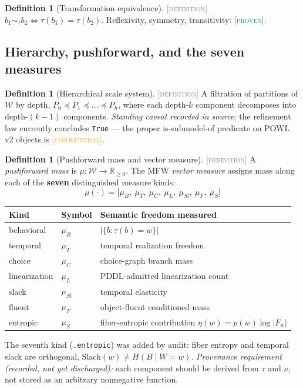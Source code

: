 \documentclass[11pt]{article}
\newcommand{\PROVEN}{\textcolor{teal}{\textsc{[proven]}}}
\newcommand{\DEFINITION}{\textcolor{gray}{\textsc{[definition]}}}
\newcommand{\CONJECTURAL}{\textcolor{orange}{\textsc{[conjectural]}}}
\newcommand{\WS}{\mathcal{W}}                  %
\newcommand{\tmap}{\tau}                       %
\newcommand{\fib}[1]{F_{#1}}                   %
\newcommand{\R}{\mathbb{R}}
\theoremstyle{plain}
\theoremstyle{definition}
\newtheorem{definition}[theorem]{Definition}
\begin{document}
\begin{definition}[Transformation equivalence]\DEFINITION\;
$b_1 \sim_\tmap b_2 \iff \tmap(b_1) = \tmap(b_2)$. Reflexivity, symmetry,
transitivity: \PROVEN.
\end{definition}

\subsection{Hierarchy, pushforward, and the seven measures}

\begin{definition}[Hierarchical scale system]\DEFINITION\;
A filtration of partitions of $\WS$ by depth,
$P_0 \preceq P_1 \preceq \dots \preceq P_h$, where each depth-$k$ component
decomposes into depth-$(k{-}1)$ components. \emph{Standing caveat recorded in
source:} the refinement law currently concludes \texttt{True} --- the proper
is-submodel-of predicate on POWL v2 objects is \CONJECTURAL.
\end{definition}

\begin{definition}[Pushforward mass and vector measure]\DEFINITION\;
A \emph{pushforward mass} is $\mu : \WS \to \R_{\ge 0}$. The MFW
\emph{vector measure} assigns mass along each of the \textbf{seven}
distinguished measure kinds:
\[
  \mu(\cdot) = \big[\mu_B,\ \mu_T,\ \mu_C,\ \mu_L,\ \mu_{Sl},\ \mu_F,\ \mu_S\big]
\]
\begin{center}
\begin{tabular}{@{}lll@{}}
\toprule
Kind & Symbol & Semantic freedom measured \\
\midrule
behavioral    & $\mu_B$    & $|\{b : \tmap(b) = w\}|$ \\
temporal      & $\mu_T$    & temporal realization freedom \\
choice        & $\mu_C$    & choice-graph branch mass \\
linearization & $\mu_L$    & PDDL-admitted linearization count \\
slack         & $\mu_{Sl}$ & temporal elasticity \\
fluent        & $\mu_F$    & object-fluent conditioned mass \\
entropic      & $\mu_S$    & fiber-entropic contribution $\eta(w) = p(w)\log|\fib{w}|$ \\
\bottomrule
\end{tabular}
\end{center}
The seventh kind (\texttt{.entropic}) was added by audit: fiber entropy and
temporal slack are orthogonal, $\mathrm{Slack}(w) \ne H(B \mid W = w)$.
\emph{Provenance requirement (recorded, not yet discharged):} each component
should be derived from $\tmap$ and $\nu$, not stored as an arbitrary
nonnegative function.
\end{definition}
\end{document}
